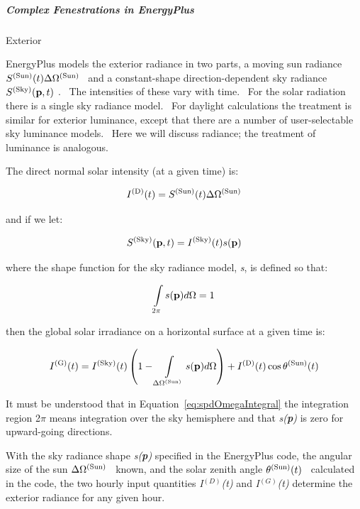\subparagraph{Complex Fenestrations in EnergyPlus}\label{complex-fenestrations-in-energyplus}

Exterior

EnergyPlus models the exterior radiance in two parts, a moving sun radiance \({S^{{\rm{(Sun)}}}}(t)\Delta {\Omega ^{{\rm{(Sun)}}}}\) ~and a constant-shape direction-dependent sky radiance \({S^{{\rm{(Sky)}}}}({\bf{p}},t)\) .~ The intensities of these vary with time.~ For the solar radiation there is a single sky radiance model.~ For daylight calculations the treatment is similar for exterior luminance, except that there are a number of user-selectable sky luminance models.~ Here we will discuss radiance; the treatment of luminance is analogous.

The direct normal solar intensity (at a given time) is:

\begin{equation}
{I^{{\rm{(D)}}}}(t) = {S^{{\rm{(Sun)}}}}(t)\Delta {\Omega ^{{\rm{(Sun)}}}}
\end{equation}

and if we let:

\begin{equation}
{S^{{\rm{(Sky)}}}}({\bf{p}},t) = {I^{{\rm{(Sky)}}}}(t)s({\bf{p}})
\end{equation}

where the shape function for the sky radiance model, \emph{s}, is defined so that:

\begin{equation}
\int\limits_{2\pi } {s({\bf{p}})d\Omega }  = 1
\label{eq:spdOmegaIntegral}
\end{equation}

then the global solar irradiance on a horizontal surface at a given time is:

\begin{equation}
{I^{{\rm{(G)}}}}(t) = {I^{{\rm{(Sky)}}}}(t)\left( {1 - \int\limits_{\Delta {\Omega ^{{\rm{(Sun)}}}}} {s({\bf{p}})d\Omega } } \right) + {I^{{\rm{(D)}}}}(t)\cos {\theta ^{{\rm{(Sun)}}}}(t)
\end{equation}

It must be understood that in Equation~\ref{eq:spdOmegaIntegral} the integration region 2\(\pi\) means integration over the sky hemisphere and that \emph{s(\textbf{p})} is zero for upward-going directions.

With the sky radiance shape \emph{s(\textbf{p})} specified in the EnergyPlus code, the angular size of the sun \(\Delta {\Omega ^{{\rm{(Sun)}}}}\) ~known, and the solar zenith angle \({\theta ^{{\rm{(Sun)}}}}(t)\) ~calculated in the code, the two hourly input quantities \emph{I}\(^{(D)}\)\emph{(t)} and \emph{I}\(^{(G)}\)\emph{(t)} determine the exterior radiance for any given hour.

